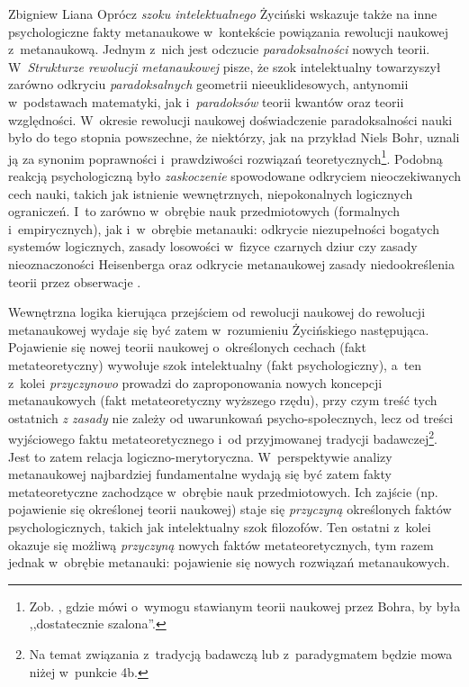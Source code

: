 \begin{artplenv}{Zbigniew Liana}
Oprócz \textit{szoku intelektualnego} Życiński wskazuje także na inne psychologiczne fakty metanaukowe w~kontekście
powiązania rewolucji naukowej z~metanaukową. Jednym z~nich jest odczucie \textit{paradoksalności} nowych teorii. W~\textit{Strukturze
rewolucji metanaukowej} pisze, że szok intelektualny towarzyszył zarówno odkryciu
\textit{paradoksalnych} geometrii nieeuklidesowych, antynomii w~podstawach matematyki, jak i~\textit{paradoksów} teorii
kwantów oraz teorii względności. W~okresie rewolucji naukowej doświadczenie paradoksalności nauki było do tego stopnia
powszechne, że niektórzy, jak na przykład Niels Bohr, uznali ją za synonim poprawności i~prawdziwości rozwiązań
teoretycznych\footnote{Zob.
\parencites[s.~9,132]{zycinski_structure_1988}[s.~16,233]{zycinski_struktura_2013},
gdzie mówi o~wymogu
stawianym teorii naukowej przez Bohra, by była ,,dostatecznie szalona''.}. Podobną reakcją psychologiczną było
\textit{zaskoczenie} spowodowane odkryciem nieoczekiwanych cech nauki, takich jak istnienie wewnętrznych, niepokonalnych
logicznych ograniczeń. I~to zarówno w~obrębie nauk przedmiotowych (formalnych i~empirycznych), jak i~w~obrębie
metanauki: odkrycie niezupełności bogatych systemów logicznych, zasady losowości w~fizyce czarnych dziur czy zasady
nieoznaczoności Heisenberga oraz odkrycie metanaukowej zasady niedookreślenia teorii przez obserwacje
\parencites[s.~11]{zycinski_structure_1988}[s.~20]{zycinski_struktura_2013}.

Wewnętrzna logika kierująca przejściem od rewolucji naukowej do rewolucji metanaukowej wydaje się być zatem w~rozumieniu
Życińskiego następująca. Pojawienie się nowej teorii naukowej o~określonych cechach (fakt metateoretyczny) wywołuje
szok intelektualny (fakt psychologiczny), a~ten z~kolei \textit{przyczynowo} prowadzi do zaproponowania nowych koncepcji
metanaukowych (fakt metateoretyczny wyższego rzędu), przy czym treść tych ostatnich \textit{z zasady }nie zależy od
uwarunkowań psycho-społecznych, lecz od treści wyjściowego faktu metateoretycznego i~od przyjmowanej tradycji
badawczej\footnote{Na temat związania z~tradycją badawczą lub z~paradygmatem będzie mowa niżej w~punkcie 4b.}. Jest to
zatem relacja logiczno-merytoryczna. W~perspektywie analizy metanaukowej najbardziej fundamentalne wydają się być zatem
fakty metateoretyczne zachodzące w~obrębie nauk przedmiotowych. Ich zajście (np. pojawienie się określonej teorii
naukowej) staje się \textit{przyczyną} określonych faktów psychologicznych, takich jak intelektualny szok filozofów. Ten
ostatni z~kolei okazuje się możliwą \textit{przyczyną} nowych faktów metateoretycznych, tym razem jednak w~obrębie
metanauki: pojawienie się nowych rozwiązań metanaukowych.


\end{artplenv}

